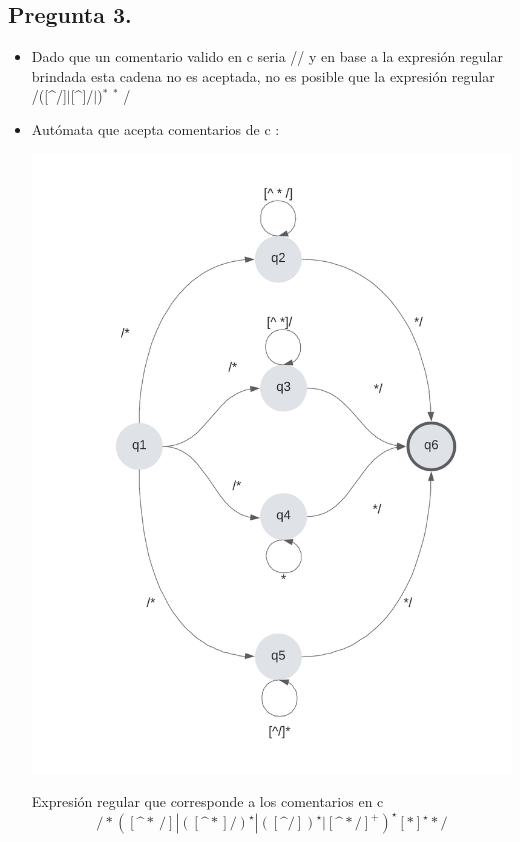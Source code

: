 \subsection*{Pregunta 3.}

\begin{itemize}  
\item  Dado que un comentario valido en c seria /\textasteriskcentered\textasteriskcentered/
  y en base a la expresión regular brindada esta cadena no es aceptada, no es posible que la
  expresión regular /\textasteriskcentered ([\textasciicircum \textasteriskcentered/]$|$[\textasciicircum \textasteriskcentered]/$|$\textasteriskcentered[\textasciicircum /])$^*$ \textasteriskcentered$^*$ \textasteriskcentered/\\

\item Autómata que acepta comentarios de c :
  \begin{center}
    \includegraphics{Comp_Pr3_2.png}
  \end{center}
  
  Expresión regular que corresponde a los comentarios en c
  \[/* \left([\text{\textasciicircum} *\: /] | \left([\text{\textasciicircum} *] /\right)^{\star} |
  \left([\text{\textasciicircum} /] \right)^{\star} | [\text{\textasciicircum} * /]^{+}\right)^{\star} [*]^{\star}*/\]\\
\end{itemize}
